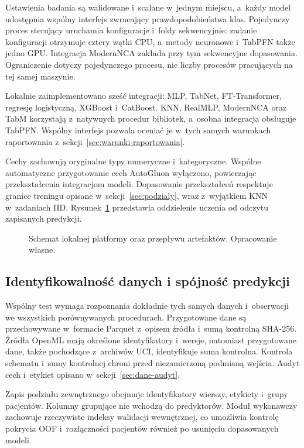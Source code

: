Ustawienia badania są walidowane i~scalane w~jednym miejscu, a~każdy model udostępnia wspólny interfejs zwracający prawdopodobieństwa klas. Pojedynczy proces sterujący uruchamia konfiguracje i~foldy sekwencyjnie: zadanie konfiguracji otrzymuje cztery wątki CPU, a~metody neuronowe i~TabPFN także jedno GPU. Integracja ModernNCA zakłada przy tym sekwencyjne dopasowania. Ograniczenie dotyczy pojedynczego procesu, nie liczby procesów pracujących na tej samej maszynie.

Lokalnie zaimplementowano sześć integracji: MLP, TabNet, FT-Transformer, regresję logistyczną, XGBoost i~CatBoost. KNN, RealMLP, ModernNCA oraz TabM korzystają z~natywnych procedur bibliotek, a~osobna integracja obsługuje TabPFN. Wspólny interfejs pozwala oceniać je w~tych samych warunkach raportowania z~sekcji~\ref{sec:warunki-raportowania}.

Cechy zachowują oryginalne typy numeryczne i~kategoryczne. Wspólne automatyczne przygotowanie cech AutoGluon wyłączono, powierzając przekształcenia integracjom modeli. Dopasowanie przekształceń respektuje granice treningu opisane w~sekcji~\ref{sec:podzialy}, wraz z~wyjątkiem KNN w~zadaniach IID. Rysunek~\ref{fig:architektura} przedstawia oddzielenie uczenia od odczytu zapisanych predykcji.

\begin{figure}[tbp]\centering\small

\caption{Schemat lokalnej platformy oraz przepływu artefaktów. Opracowanie własne.}
\label{fig:architektura}
\end{figure}

\subsection{Identyfikowalność danych i spójność predykcji}
\label{sec:izolacja-platformy}

Wspólny test wymaga rozpoznania dokładnie tych samych danych i~obserwacji we wszystkich porównywanych procedurach. Przygotowane dane są przechowywane w~formacie Parquet z~opisem źródła i~sumą kontrolną SHA-256. Źródła OpenML mają określone identyfikatory i~wersje, natomiast przygotowane dane, także pochodzące z~archiwów UCI, identyfikuje suma kontrolna. Kontrola schematu i~sumy kontrolnej chroni przed niezamierzoną podmianą wejścia. Audyt cech i~etykiet opisano w~sekcji~\ref{sec:dane-audyt}.

Zapis podziału zewnętrznego obejmuje identyfikatory wierszy, etykiety i~grupy pacjentów. Kolumny grupujące nie wchodzą do predyktorów. Moduł wykonawczy zachowuje rzeczywiste indeksy walidacji wewnętrznej, co umożliwia kontrolę pokrycia OOF i~rozłączności pacjentów również po usunięciu dopasowanych modeli.

